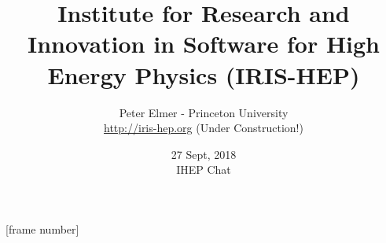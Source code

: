 \documentclass{beamer}
\title{Institute for Research and Innovation in Software for High Energy Physics (IRIS-HEP)}
\author{Peter Elmer - Princeton University \\
        \url{http://iris-hep.org} (Under Construction!)}
\date{27 Sept, 2018 \\ IHEP Chat}
\begin{document}
\maketitle



%
%

[frame number]










%
\end{document}
